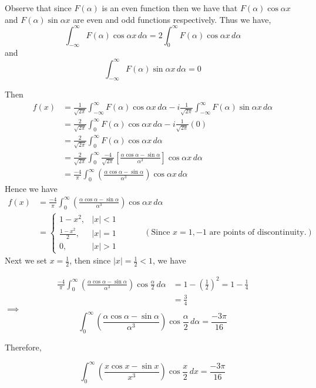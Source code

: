 \documentclass[12pt]{scrartcl}
\begin{document}
\begin{soln}
\begin{mdframed}[style=observebox]
	Observe that since $F(\alpha)$ is an even function then we have that $F(\alpha)\cos \alpha x$ and $F(\alpha)\sin \alpha x$ are even and odd functions respectively. Thus we have,
	\[
	\int_{-\infty}^{\infty} F(\alpha) \cos \alpha x \, d\alpha = 2\int_{0}^{\infty} F(\alpha) \cos \alpha x \, d\alpha
\]
and 
\[
	\int_{-\infty}^{\infty} F(\alpha) \sin \alpha x \, d\alpha = 0
\]
\end{mdframed}
Then 
\begin{align*}
	f(x) & = \frac{1}{\sqrt{2\pi}} \int_{-\infty}^{\infty} F(\alpha) \cos \alpha x \, d\alpha - i \frac{1}{\sqrt{2\pi}} \int_{-\infty}^{\infty} F(\alpha) \sin \alpha x \, d\alpha \\
		 & = \frac{2}{\sqrt{2\pi}} \int_{0}^{\infty} F(\alpha) \cos \alpha x \, d\alpha - i \frac{1}{\sqrt{2\pi}} (0) \\
		 & = \frac{2}{\sqrt{2\pi}} \int_{0}^{\infty} F(\alpha) \cos \alpha x \, d\alpha \\
		 & = \frac{2}{\sqrt{2\pi}} \int_{0}^{\infty} \frac{-4}{\sqrt{2\pi}}  \left[ \frac{\alpha \cos \alpha - \sin \alpha}{\alpha^3} \right] \cos \alpha x \, d\alpha \\
		 & = \frac{-4}{\pi} \int_{0}^{\infty} \left( \frac{\alpha \cos \alpha - \sin \alpha}{\alpha^3} \right) \cos \alpha x \, d\alpha
\end{align*}
Hence we have 
\begin{align*}
	f(x) & = \frac{-4}{\pi} \int_{0}^{\infty} \left( \frac{\alpha \cos \alpha - \sin \alpha}{\alpha^3} \right) \cos \alpha x \, d\alpha \\
		 & = \begin{cases}
																1-x^2, & |x| < 1 \\
																\frac{1-x^2}{2}, & |x|=1 \\
																0, & |x| > 1
\end{cases} \qquad \quad (\text{Since $x = 1,-1$ are points of discontinuity.})
\end{align*}
Next we set $x = \frac12$, then since $|x| = \frac12 < 1$, we have 

\begin{align*}
	\frac{-4}{\pi} \int_{0}^{\infty} \left( \frac{\alpha \cos \alpha - \sin \alpha}{\alpha^3} \right) \cos \frac{\alpha}{2} \, d\alpha  & = 1 - \left(\frac{1}{2}\right)^2 = 1 - \frac14 \\
 													& = \frac34
\end{align*}
$\implies$ 
\[
	\int_{0}^{\infty} \left( \frac{\alpha \cos \alpha - \sin \alpha}{\alpha^3} \right) \cos \frac{\alpha}{2} \, d\alpha = \frac{-3\pi}{16}
\]

Therefore,
\begin{mdframed}[style=mybox]
	\[
	\int_{0}^{\infty} \left( \frac{x \cos x - \sin x}{x^3} \right) \cos \frac{x}{2} \, dx = \frac{-3\pi}{16}
\]
\end{mdframed}

\end{soln}
















\end{document}
